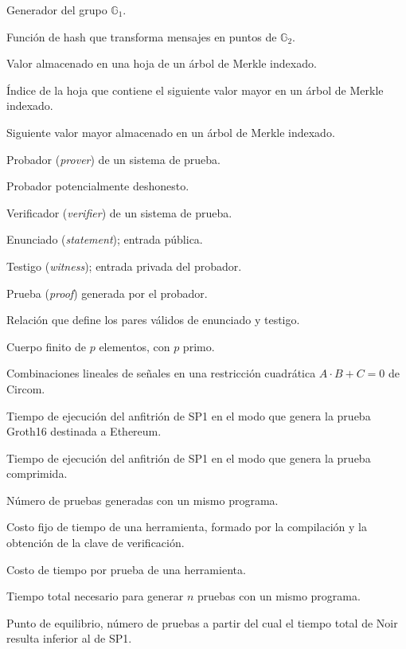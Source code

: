 \begin{listsymbol}
	\item[$g_1$] Generador del grupo $\mathbb{G}_1$.
	\item[$H_{\mathbb{G}_2}$] Función de hash que transforma mensajes en puntos de $\mathbb{G}_2$.
	\item[$v$] Valor almacenado en una hoja de un árbol de Merkle indexado.
	\item[$i_{\mathrm{sig}}$] Índice de la hoja que contiene el siguiente valor mayor en un árbol de Merkle indexado.
	\item[$v_{\mathrm{sig}}$] Siguiente valor mayor almacenado en un árbol de Merkle indexado.
	\item[$\mathcal{P}$] Probador (\textit{prover}) de un sistema de prueba.
	\item[$\mathcal{P}^{*}$] Probador potencialmente deshonesto.
	\item[$\mathcal{V}$] Verificador (\textit{verifier}) de un sistema de prueba.
	\item[$x$] Enunciado (\textit{statement}); entrada pública.
	\item[$w$] Testigo (\textit{witness}); entrada privada del probador.
	\item[$\pi$] Prueba (\textit{proof}) generada por el probador.
	\item[$\mathcal{R}$] Relación que define los pares válidos de enunciado y testigo.
	\item[$\mathbb{F}_p$] Cuerpo finito de $p$ elementos, con $p$ primo.
	\item[$A, B, C$] Combinaciones lineales de señales en una restricción cuadrática $A \cdot B + C = 0$ de Circom.
	\item[$T_{\mathrm{Ethereum}}$] Tiempo de ejecución del anfitrión de SP1 en el modo que genera la prueba Groth16 destinada a Ethereum.
	\item[$T_{\mathrm{comprimido}}$] Tiempo de ejecución del anfitrión de SP1 en el modo que genera la prueba comprimida.
	\item[$n$] Número de pruebas generadas con un mismo programa.
	\item[$t_{\mathrm{fijo}}$] Costo fijo de tiempo de una herramienta, formado por la compilación y la obtención de la clave de verificación.
	\item[$t_{\mathrm{prueba}}$] Costo de tiempo por prueba de una herramienta.
	\item[$t_{\mathrm{total}}(n)$] Tiempo total necesario para generar $n$ pruebas con un mismo programa.
	\item[$n^{*}$] Punto de equilibrio, número de pruebas a partir del cual el tiempo total de Noir resulta inferior al de SP1.
\end{listsymbol}
